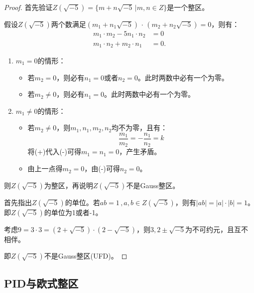 \begin{proof}
	首先验证$Z(\sqrt{-5})=\{m+n\sqrt{-5}\, \Big| m,n\in Z\}$是一个整区。\par
	假设$Z(\sqrt{-5})$两个数满足$(m_{1}+n_{1}\sqrt{-5})\, \cdot \, (m_{2}+n_{2}\sqrt{-5})=0$，则有：
\begin{equation*}
	\begin{aligned}
			m_{1}\cdot m_{2}-5n_{1} \cdot n_{2}&=0\\
			m_{1}\cdot n_{2}+m_{2}\cdot n_{1}&=0.
	\end{aligned}\tag{-}
\end{equation*}
	\begin{enumerate}
		\item $m_{1}=0$的情形：
		\begin{itemize}
			\item 若$m_{2}=0$，则必有$n_{1}=0$或者$n_{2}=0$。此时两数中必有一个为零。
			\item 若$m_{2}\neq 0$，则必有$n_{1}=0$。此时两数中必有一个为零。
		\end{itemize}
		\item $m_{1}\neq 0$的情形：
		\begin{itemize}
			\item 若$m_{2}\neq 0$，则$m_{1},n_{1},m_{2},n_{2}$均不为零，且有：
			\begin{equation*}
				\frac{m_{1}}{m_{2}}=-\frac{n_{1}}{n_{2}}=k\tag{+}
			\end{equation*}
			将(+)代入(-)可得$m_{1}=n_{1}=0$，产生矛盾。
			\item 由上一点得$m_{2}=0$，由(-)可得$n_{2}=0$。
			
		\end{itemize}
	\end{enumerate}
	则$Z(\sqrt{-5})$为整区，再说明$Z(\sqrt{-5})$不是Gauss整区。\par
	首先指出$Z(\sqrt{-5})$的单位。若$ab=1\, , a,b\in Z(\sqrt{-5})$，则有$|ab|=|a|\cdot|b|=1$。即$Z(\sqrt{-5})$的单位为1或者-1。\par
	考虑$9=3\cdot 3=(2+\sqrt{-5})\cdot(2-\sqrt{-5})$，则$3,2\pm \sqrt{-5}$为不可约元，且互不相伴。\par
	即$Z(\sqrt{-5})$不是Gauss整区(UFD)。
\end{proof}





\subsection{PID与欧式整区}

